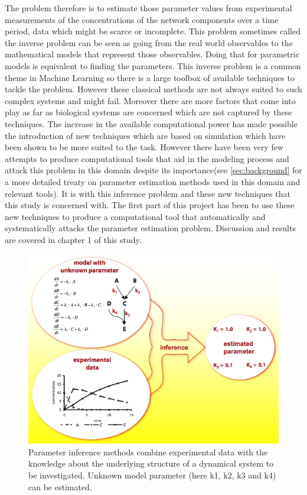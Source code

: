 \documentclass[12pt,a4paper,titlepage]{article}
\begin{document}
The problem therefore is to estimate those parameter values from experimental measurements of the concentrations of the network components over a time period, data which might be scarce or incomplete. This problem sometimes called the inverse problem can be seen as going from the real world observables to the mathematical models that represent those observables. Doing that for parametric models is equivalent to finding the parameters. This inverse problem is a common theme in Machine Learning so there is a large toolbox of available techniques to tackle the problem. However these classical methods are not always suited to such complex systems and might fail. Moreover there are more factors that come into play as far as biological systems are concerned which are not captured by these techniques. The increase in the available computational power has made possible the introduction of new techniques which are based on simulation which have been shown to be more suited to the task. However there have been very few attempts to produce computational tools that aid in the modeling process and attack this problem in this domain despite its importance(see \ref{sec:background} for a more detailed treaty on parameter estimation methods used in this domain and relevant tools). It is with this inference problem and these new techniques that this study is concerned with.  The first part of this project has been to use these new techniques to produce a computational tool that automatically and systematically attacks the parameter estimation problem. Discussion and results are covered in chapter 1 of this study. 

\begin{figure}
\centering
\includegraphics[width=0.5\linewidth]{inference}
\caption{Parameter inference methods combine experimental data with the knowledge about the underlying structure of a dynamical system to be investigated. Unknown model parameter (here k1, k2, k3 and k4) can be estimated.}
\label{fig:inference}
\end{figure}
\end{document}
